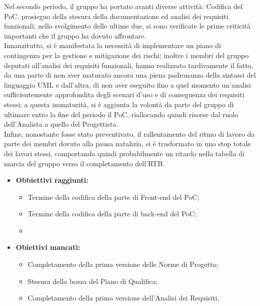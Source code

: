 Nel secondo periodo, il gruppo ha portato avanti diverse attività: Codifica del PoC, prosieguo della stesura della documentazione ed analisi dei requisiti funzionali; nello svolgimento delle ultime due, si sono verificate
le prime criticità importanti che il gruppo ha dovuto affrontare.\\
Innanzitutto, si è manifestata la necessità di implementare un piano di contingenza per la gestione e mitigazione dei rischi; inoltre i membri del gruppo deputati
all'analisi dei requisiti funzionali, hanno realizzato tardivamente il fatto, da una parte di non aver maturato ancora una piena padronanza della sintassi del linguaggio UML e dall'altra, di non aver eseguito fino a quel
momento un'analisi sufficientemente approfondita degli scenari d'uso e di conseguenza dei requisiti stessi; a questa immaturità, si è aggiunta la volontà da parte del gruppo di ultimare
entro la fine del periodo il PoC, riallocando quindi risorse dal ruolo dell'Analista a quello del Progettista. \\
Infine, nonostante fosse stato preventivato, il rallentamento del ritmo di lavoro da parte dei membri
dovuto alla pausa natalizia, si è trasformato in uno stop totale dei lavori stessi, comportando quindi probabilmente un ritardo nella tabella di marcia del gruppo verso il completamento dell'RTB.
\begin{itemize}
\item \textbf{Obbiettivi raggiunti:}
    \begin{itemize}
        \item Termine della codifica della parte di Front-end del PoC;
        \item Termine della codifica della parte di back-end del PoC;
        \item
    \end{itemize}
    \item \textbf{Obiettivi mancati:}
    \begin{itemize}
        \item Completamento della prima versione delle Norme di Progetto;
        \item Stesura della bozza del Piano di Qualifica;
        \item Completamento della prima versione dell'Analisi dei Requisiti.
    \end{itemize}
\end{itemize}